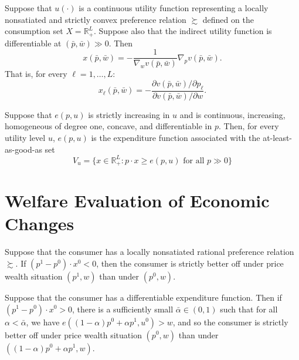 \begin{prop}
    Suppose that $u(\cdot)$ is a continuous utility function representing a locally nonsatiated and strictly convex preference relation $\succsim$ defined on the consumption set $X = \mathbb{R}^L_+$. Suppose also that the indirect utility function is differentiable at $(\bar{p}, \bar{w}) \gg 0$. Then
    \begin{equation*}
        x(\bar{p}, \bar{w}) = - \frac{1}{\nabla_w v(\bar{p}, \bar{w})} \nabla_p v(\bar{p}, \bar{w}).
    \end{equation*}
    That is, for every $\ell = 1, \dots, L$:
    \begin{equation*}
        x_\ell (\bar{p}, \bar{w}) = - \frac{\partial v(\bar{p}, \bar{w}) / \partial p_\ell}{\partial v(\bar{p}, \bar{w}) / \partial w}.
    \end{equation*}
\end{prop}

\begin{prop}
    Suppose that $e(p, u)$ is strictly increasing in $u$ and is continuous, increasing, homogeneous of degree one, concave, and differentiable in $p$. Then, for every utility level $u$, $e(p, u)$ is the expenditure function associated with the at-least-as-good-as set
    \begin{equation*}
        V_u = \{x \in \mathbb{R}^L_+ : p \cdot x \geq e(p, u) \text{ for all } p \gg 0\}
    \end{equation*}
\end{prop}


\section{Welfare Evaluation of Economic Changes}

\begin{prop}
    Suppose that the consumer has a locally nonsatiated rational preference relation $\succsim$. If $(p^1 - p^0) \cdot x^0 < 0$, then the consumer is strictly better off under price wealth situation $(p^1, w)$ than under $(p^0, w)$.
\end{prop}

\begin{prop}
    Suppose that the consumer has a differentiable expenditure function. Then if $(p^1 - p^0) \cdot x^0 > 0$, there is a sufficiently small $\bar{\alpha} \in (0, 1)$ such that for all $\alpha < \bar{\alpha}$, we have $e((1 - \alpha) p^0 + \alpha p^1, u^0) > w$, and so the consumer is strictly better off under price wealth situation $(p^0, w)$ than under $((1 - \alpha) p^0 + \alpha p^1, w)$.
\end{prop}

